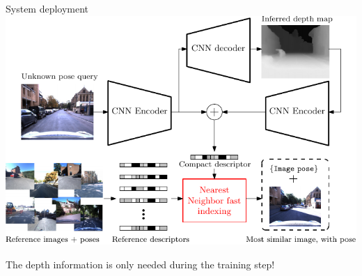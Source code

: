 \begin{frame}{System deployment}
	\centering
	\includegraphics[width=0.7\linewidth]{vect/method/fig4/final}
	\vfill	

	The depth information is only needed during the training step!
\end{frame}